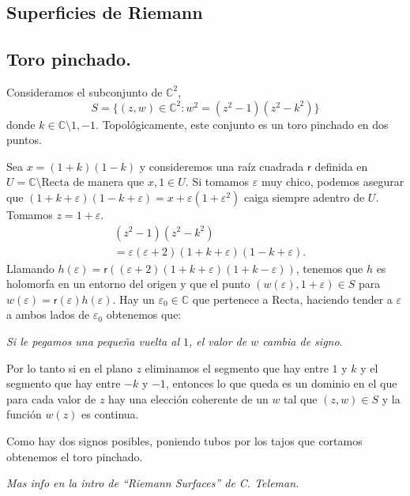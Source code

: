 \documentclass[11pt]{amsart}
\newcommand{\itt}[1]{\textit{#1}}
\newcommand\CC{{\mathbb{C}}}
\renewcommand\epsilon{\varepsilon}
\begin{document}
\begin{multicols}{2}

\section{Superficies de Riemann}
\subsection*{Toro pinchado.}
Consideramos el subconjunto de $\CC^2$,
{\small\[
 S=\{(z,w)\in\CC^2: w^2 = (z^2-1)(z^2-k^2)\}
\]}
donde $k\in\CC\setminus{1,-1}$. Topol\'ogicamente, este conjunto es un 
toro pinchado en dos puntos. 

Sea $x=(1+k)(1-k)$ y consideremos una
ra\'iz cuadrada $\mathsf{r}$ definida en $U=\CC\setminus\text{Recta}$ de 
manera que $x,1\in U$. Si tomamos $\epsilon$ muy chico, podemos 
asegurar que $(1+k+\epsilon)(1-k+\epsilon) = x + \epsilon(1+\epsilon^2)$ 
caiga siempre adentro de $U$. Tomamos $z=1+\epsilon$.
\[
 \begin{aligned}
  &(z^2-1)(z^2-k^2)\\&=\epsilon(\epsilon+2)(1+k+\epsilon)(1-k+\epsilon).
 \end{aligned}
\]
Llamando 
$h(\epsilon)=\mathsf{r}((\epsilon+2)(1+k+\epsilon)(1+k-\epsilon))$, 
tenemos que $h$ es holomorfa en un entorno del origen y que el punto 
$(w(\epsilon),1+\epsilon)\in S$ para $w(\epsilon) = 
\mathsf{r(\epsilon)}h(\epsilon)$. Hay un $\epsilon_0\in\CC$ que pertenece a
$\text{Recta}$, haciendo tender a $\epsilon$ a ambos lados de 
$\epsilon_0$ obtenemos que:

\itt{Si le pegamos una pequeña vuelta al $1$, el valor de $w$ cambia de 
signo}.

Por lo tanto si en el plano $z$ eliminamos el segmento que hay entre $1$ y 
$k$ y el segmento que hay entre $-k$ y $-1$, entonces lo que queda es un 
dominio en el que para cada valor de $z$ hay una elección coherente de un 
$w$ tal que $(z,w)\in S$ y la función $w(z)$ es continua.

Como hay dos signos posibles, poniendo tubos por los tajos que cortamos 
obtenemos el toro pinchado.

\itt{Mas info en la intro de ``Riemann Surfaces'' de C. Teleman.}
\newpage
\end{multicols}
\end{document}
